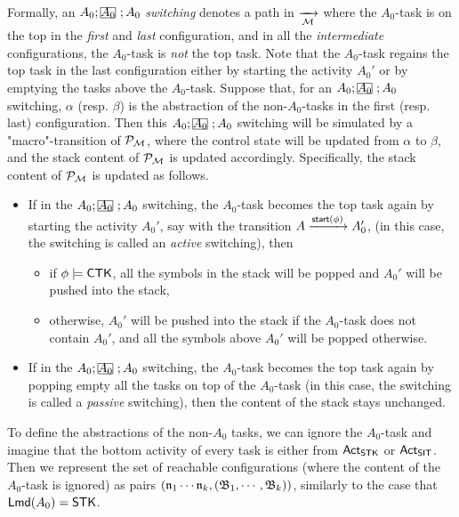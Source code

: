 Formally, an $A_0;\mhcancel{A_0};A_0$ \emph{switching} denotes a path in $\xrightarrow[{\mathcal{M} }]{}$ where the $A_0$-task is on the top in the \emph{first} and \emph{last} configuration, and in all the \emph{intermediate} configurations, the $A_0$-task is \emph{not} the top task. 
%
Note that the $A_0$-task regains the top task in the last configuration either by starting the activity $A_0'$ or by emptying the tasks above the $A_0$-task. Suppose that, for an $A_0;\mhcancel{A_0};A_0$ switching, $\alpha$ (resp. $\beta$) is the abstraction of the non-$A_0$-tasks in the first (resp. last) configuration. 
Then this $A_0;\mhcancel{A_0};A_0$ switching will be simulated by a "macro"-transition of ${\mathcal{P} }_{{\mathcal{M} }}$, where the control state will be updated from $\alpha$ to $\beta$, and the stack content of ${\mathcal{P} }_{{\mathcal{M} }}$ is updated accordingly. 
Specifically, the stack content of ${\mathcal{P} }_{{\mathcal{M} }}$ is updated as follows. 
\begin{itemize}
    \item If in the $A_0; \mhcancel{A_0}; A_0$ switching, the $A_0$-task becomes the top task again by starting the activity $A_0'$, say with the transition $A\xrightarrow{{\mathsf{start} }(\phi)}A_0'$, (in this case, the switching is called an \emph{active} switching), then
    \begin{itemize}
        \item if $\phi \models {\sf CTK}$, all the symbols in the stack will be popped and $A_0'$ will be pushed into the stack,
        \item otherwise, $A_0'$ will be pushed into the stack if the $A_0$-task does not contain $A_0'$, and all the symbols above $A_0'$ will be popped otherwise.
    \end{itemize}
%
    \item If in the $A_0; \mhcancel{A_0}; A_0$ switching, the $A_0$-task becomes the top task again by popping empty all the tasks on top of the $A_0$-task (in this case, the switching is called a \emph{passive} switching), then the content of the stack stays unchanged.
%        
\end{itemize}

To define the abstractions of the non-$A_0$ tasks, we can ignore the $A_0$-task and imagine that the bottom activity of every task is either from ${\sf Act}_{{\sf STK}}$ or ${\sf Act}_{{\sf SIT}}$.  Then we represent the set of reachable configurations (where the content of the $A_0$-task is ignored) as pairs $(\mathfrak{n}_1 \cdots \mathfrak{n}_k, ({\mathfrak{B} }_1, \cdots, {\mathfrak{B} }_k))$, similarly to the case that ${\sf Lmd}(A_0) = {\sf STK}$. 

